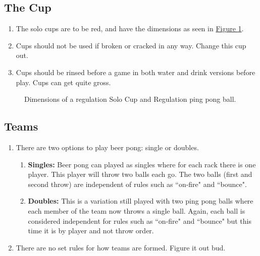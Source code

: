 	\subsection{The Cup}\label{ssec:Cup}
        \begin{enumerate}[label=(\roman*), ref=\roman*]
            \item \label{sssec:Cup,dim} The solo cups are to be red,  and have the dimensions as seen in \hyperref[fig:solocup]{Figure \ref*{fig:solocup}}. 
            \item \label{sssec:Cup,broken} Cups should not be used if broken or cracked in any way. Change this cup out. 
            \item \label{ssec:Cup,rinsing} Cups should be rinsed before a game in both water and drink versions before play. Cups can get quite gross. 
        \end{enumerate}
        \begin{figure}[H]
            \centering
            \def\svgwidth{\columnwidth}
            
            \caption{Dimensions of a regulation  Solo Cup and Regulation ping pong ball.}
            \label{fig:solocup}
        \end{figure}
	\subsection{Teams}\label{ssec:Teams}
		\begin{enumerate}[label=(\roman*), ref=\roman*]
            \item \label{sssec:teams,options} There are two options to play beer pong: single or doubles. 
                \begin{enumerate}[label=(\alph*), leftmargin=2cm]%
                    \item \textbf{Singles:} Beer pong can played as singles where for each rack there is one player.
                        This player will throw two balls each go. 
                        The two balls (first and second throw) are independent of rules such as ``on-fire" and ``bounce".
                    \item \textbf{Doubles:}	This is a variation still played with two ping pong balls where each member of the team now throws a single ball.
                        Again, each ball is considered independent for rules such as ``on-fire" and ``bounce" but this time it is by player and not throw order.
                \end{enumerate} 
            \item \label{sssec:teams,choosing} There are no set rules for how teams are formed. Figure it out bud. 
        \end{enumerate}
